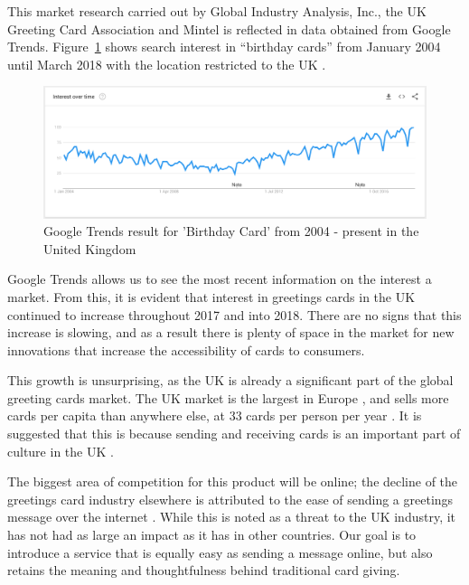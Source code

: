 \documentclass[10pt,a4paper]{article}
\begin{document}
This market research carried out by Global Industry Analysis, Inc., the UK Greeting Card Association and Mintel is reflected in data obtained from Google Trends. Figure~\ref{fig:google_trends} shows search interest in ``birthday cards'' from January 2004 until March 2018 with the location restricted to the UK \citep{google_trends}.

  \begin{figure}
    \includegraphics[width=\textwidth]{birthday_cards_google_trends.png}
    \caption{Google Trends result for 'Birthday Card' from 2004 - present in the United Kingdom}
    \label{fig:google_trends}
  \end{figure}

Google Trends allows us to see the most recent information on the interest a market. From this, it is evident that interest in greetings cards in the UK continued to increase throughout 2017 and into 2018. There are no signs that this increase is slowing, and as a result there is plenty of space in the market for new innovations that increase the accessibility of cards to consumers.

This growth is unsurprising, as the UK is already a significant part of the global greeting cards market. The UK market is the largest in Europe \citep{strategyr}, and sells more cards per capita than anywhere else, at 33 cards per person per year \citep{greetingcardassociation}. It is suggested that this is because sending and receiving cards is an important part of culture in the UK \citep{greetingcardassociation}.

The biggest area of competition for this product will be online; the decline of the greetings card industry elsewhere is attributed to the ease of sending a greetings message over the internet \citep{npr}. While this is noted as a threat to the UK industry, it has not had as large an impact as it has in other countries\citep{mintel}. Our goal is to introduce a service that is equally easy as sending a message online, but also retains the meaning and thoughtfulness behind traditional card giving.
\end{document}
